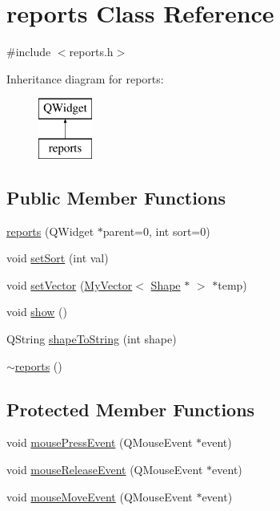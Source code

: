 \hypertarget{classreports}{\section{reports Class Reference}
\label{classreports}
}


{\ttfamily \#include $<$reports.\-h$>$}

Inheritance diagram for reports\-:\begin{figure}[H]
\begin{center}
\leavevmode
\includegraphics[height=2.000000cm]{classreports}
\end{center}
\end{figure}
\subsection*{Public Member Functions}
\begin{DoxyCompactItemize}
\item 
\hyperlink{classreports_af072c228ae3065ef7566630d3f6b131c}{reports} (Q\-Widget $\ast$parent=0, int sort=0)
\item 
void \hyperlink{classreports_af5a4ac35dfcd66f70bfabfe2e038133d}{set\-Sort} (int val)
\item 
void \hyperlink{classreports_ac69783107c2b5021c60cf2042f0e7fe4}{set\-Vector} (\hyperlink{classnserkkvector_1_1MyVector}{My\-Vector}$<$ \hyperlink{classShape}{Shape} $\ast$ $>$ $\ast$temp)
\item 
void \hyperlink{classreports_a73ab95a284ad50c376a0c15b38fb87f7}{show} ()
\item 
Q\-String \hyperlink{classreports_aadc1cddcb81c3012386f185ba652cd88}{shape\-To\-String} (int shape)
\item 
\hyperlink{classreports_a374c8e1243559fc489fc9a1a6fc0d2a9}{$\sim$reports} ()
\end{DoxyCompactItemize}
\subsection*{Protected Member Functions}
\begin{DoxyCompactItemize}
\item 
void \hyperlink{classreports_a3a6d1c382d266c47ffacf677b932e50c}{mouse\-Press\-Event} (Q\-Mouse\-Event $\ast$event)
\item 
void \hyperlink{classreports_a0db47ff16b3d9f115f1449903ef710b5}{mouse\-Release\-Event} (Q\-Mouse\-Event $\ast$event)
\item 
void \hyperlink{classreports_a39bef31a4874710db18191796a640e27}{mouse\-Move\-Event} (Q\-Mouse\-Event $\ast$event)
\end{DoxyCompactItemize}
